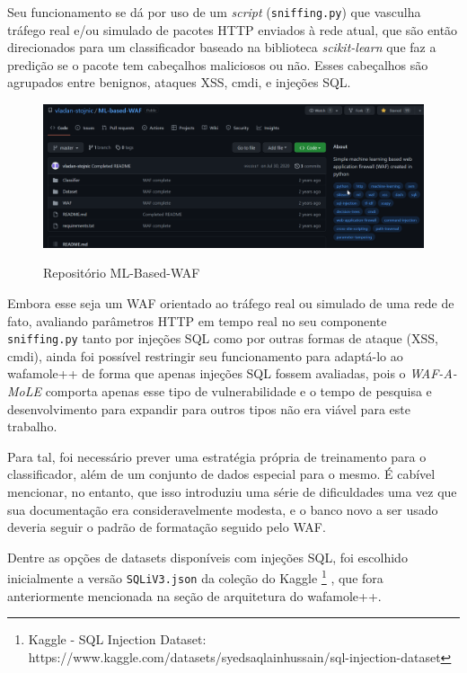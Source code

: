 Seu funcionamento se dá por uso de um \textit{script} (\verb+sniffing.py+) que vasculha tráfego real e/ou simulado de pacotes HTTP enviados à rede atual, que são então direcionados para um classificador baseado na biblioteca \textit{scikit-learn} que faz a predição se o pacote tem cabeçalhos maliciosos ou não. Esses cabeçalhos são agrupados entre benignos, ataques XSS, cmdi, e injeções SQL.

\begin{figure}[ht]
    \centering
    \caption{Repositório ML-Based-WAF}
    \includegraphics[width=16cm]{figuras/MLBasedWAF.png} 
    \label{fig:internet} 
\end{figure}

Embora esse seja um WAF orientado ao tráfego real ou simulado de uma rede de fato, avaliando parâmetros HTTP em tempo real no seu componente \verb+sniffing.py+ tanto por injeções SQL como por outras formas de ataque (XSS, cmdi), ainda foi possível restringir seu funcionamento para adaptá-lo ao wafamole++ de forma que apenas injeções SQL fossem avaliadas, pois o \textit{WAF-A-MoLE} comporta apenas esse tipo de vulnerabilidade e o tempo de pesquisa e desenvolvimento para expandir para outros tipos não era viável para este trabalho.

Para tal, foi necessário prever uma estratégia própria de treinamento para o classificador, além de um conjunto de dados especial para o mesmo. É cabível mencionar, no entanto, que isso introduziu uma série de dificuldades uma vez que sua documentação era consideravelmente modesta, e o banco novo a ser usado deveria seguir o padrão de formatação seguido pelo WAF.

Dentre as opções de datasets disponíveis com injeções SQL, foi escolhido inicialmente a versão \verb+SQLiV3.json+ da coleção do Kaggle \footnote{Kaggle - SQL Injection Dataset: https://www.kaggle.com/datasets/syedsaqlainhussain/sql-injection-dataset} \cite{kaggle_dataset_sql}, que fora anteriormente mencionada na seção de arquitetura do wafamole++.

